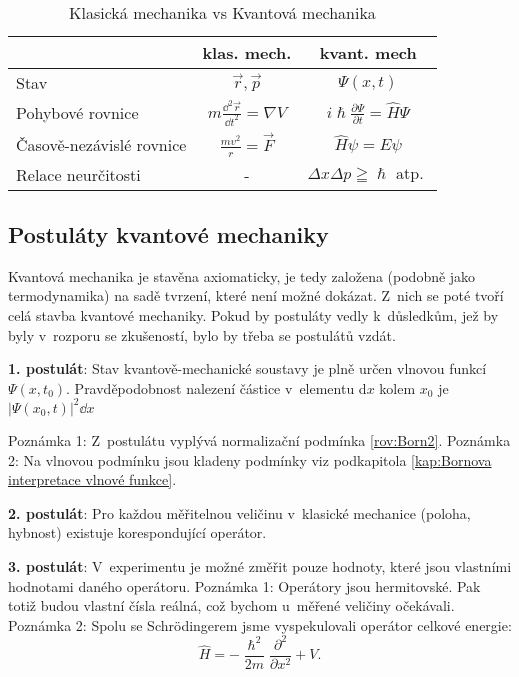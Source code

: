 \begin{table}
\centering
\caption{Klasická mechanika vs Kvantová mechanika}
\renewcommand{\arraystretch}{1.8}
\begin{tabular}{p{7cm}cc}
\toprule
 & klas. mech. & kvant. mech\\
\midrule
Stav &$\vec{r}, \vec{p}$  & $\Psi(x,t)$ \\
Pohybové rovnice & $m\frac{\dd ^2 \vec{r}}{\dd t^2} = \nabla V$ & $ i\hslash\frac{\partial \Psi}{\partial t} = \hat{H}\Psi$\\
Časově-nezávislé rovnice & $\frac{mv^2}{r} = \vec{F} $ & $\hat{H}\psi = E\psi$ \\
Relace neurčitosti & - & $\Delta x \Delta p \geqq \hslash \mbox {          atp. }$ \\
\bottomrule
\end{tabular}
\end{table}


\subsection{Postuláty kvantové mechaniky}

Kvantová mechanika je stavěna axiomaticky, je tedy založena (podobně jako termodynamika) na sadě tvrzení, které není možné dokázat. Z~nich se poté tvoří celá stavba kvantové mechaniky. Pokud by postuláty vedly k~důsledkům, jež by byly v~rozporu se zkušeností, bylo by třeba se postulátů vzdát.

{\bf 1. postulát}: Stav kvantově-mechanické soustavy je plně určen vlnovou funkcí $\Psi(x,t_0)$. Pravděpodobnost nalezení částice v~elementu d$x$ kolem $x_0$ je  $|\Psi(x_0,t)|^2\dd x$

\noindent Poznámka 1: Z~postulátu vyplývá normalizační podmínka \ref{rov:Born2}.
\noindent Poznámka 2: Na vlnovou podmínku jsou kladeny podmínky viz podkapitola \ref{kap:Bornova interpretace vlnové funkce}.

{\bf 2. postulát}: Pro každou měřitelnou veličinu v~klasické mechanice (poloha, hybnost) existuje korespondující operátor.

{\bf 3. postulát}: V~experimentu je možné změřit pouze hodnoty, které jsou vlastními hodnotami daného operátoru.
\noindent Poznámka 1: Operátory jsou hermitovské. Pak totiž budou vlastní čísla reálná, což bychom u~měřené veličiny očekávali.
\noindent Poznámka 2: Spolu se Schr\"odingerem jsme vyspekulovali operátor celkové energie:
\begin{equation}
\hat{H} = - \frac{\hslash^2}{2m}\frac{\partial ^2}{\partial x^2} + V \mbox{.}
\label{rov:Postulaty1}
\end{equation}

